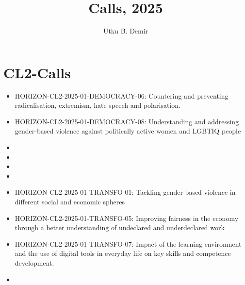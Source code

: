
\title{Calls, 2025}
\author{Utku B. Demir}


\maketitle

\section{CL2-Calls}

\begin{itemize}
	\item HORIZON-CL2-2025-01-DEMOCRACY-06: Countering and preventing radicalisation, extremism, hate speech and polarisation.
	\item HORIZON-CL2-2025-01-DEMOCRACY-08: Understanding and addressing gender-based violence against politically active women and LGBTIQ people
	\item {}
	\item {}
	\item {}
	\item {}
	\item HORIZON-CL2-2025-01-TRANSFO-01: Tackling gender-based violence in different social and economic spheres
	\item HORIZON-CL2-2025-01-TRANSFO-05: Improving fairness in the economy through a better understanding of undeclared and underdeclared work
	\item HORIZON-CL2-2025-01-TRANSFO-07: Impact of the learning environment and the use  of digital tools in everyday life on key skills and competence development.
	\item {}
\end{itemize}

\printbibliography

